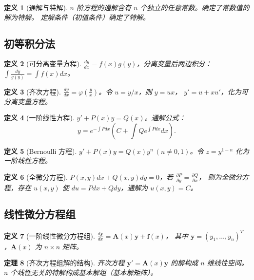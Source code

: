 \documentclass[12pt,a4paper]{ctexart}
\newtheorem{theorem}{定理}[section]
\newtheorem{definition}[theorem]{定义}
\theoremstyle{remark}
\begin{document}
\begin{definition}[通解与特解]
$n$ 阶方程的通解含有 $n$ 个独立的任意常数。确定了常数值的解为特解。
定解条件（初值条件）确定了特解。
\end{definition}

\subsection{初等积分法}

\begin{definition}[可分离变量方程]
$\frac{dy}{dx} = f(x)g(y)$，分离变量后两边积分：
$\int \frac{dy}{g(y)} = \int f(x) dx$。
\end{definition}

\begin{definition}[齐次方程]
$\frac{dy}{dx} = \varphi(\frac{y}{x})$。令 $u = y/x$，则 $y = ux$，
$y' = u + x u'$，化为可分离变量方程。
\end{definition}

\begin{definition}[一阶线性方程]
$y' + P(x)y = Q(x)$。通解公式：
\[
y = e^{-\int P dx}\left(C + \int Q e^{\int P dx} dx\right).
\]
\end{definition}

\begin{definition}[Bernoulli 方程]
$y' + P(x)y = Q(x)y^n\ (n \neq 0,1)$。令 $z = y^{1-n}$ 化为一阶线性方程。
\end{definition}

\begin{definition}[全微分方程]
$P(x,y)dx + Q(x,y)dy = 0$，若 $\frac{\partial P}{\partial y} = \frac{\partial Q}{\partial x}$，
则为全微分方程，存在 $u(x,y)$ 使 $du = Pdx + Qdy$，通解为 $u(x,y) = C$。
\end{definition}

\subsection{线性微分方程组}

\begin{definition}[一阶线性微分方程组]
$\frac{d\mathbf{y}}{dx} = \mathbf{A}(x)\mathbf{y} + \mathbf{f}(x)$，
其中 $\mathbf{y} = (y_1,\dots,y_n)^T$，$\mathbf{A}(x)$ 为 $n\times n$ 矩阵。
\end{definition}

\begin{theorem}[齐次方程组解的结构]
齐次方程 $\mathbf{y}' = \mathbf{A}(x)\mathbf{y}$ 的解构成 $n$ 维线性空间。
$n$ 个线性无关的特解构成基本解组（基本解矩阵）。
\end{theorem}
\end{document}
